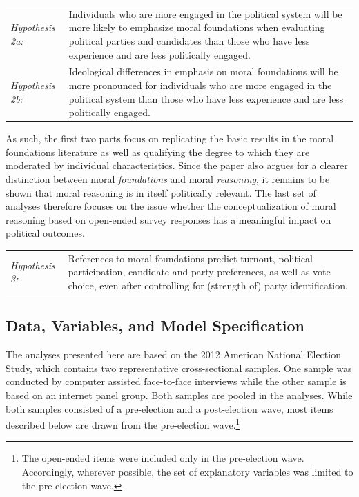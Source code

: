 \documentclass[12pt]{article}
\begin{document}
\vspace{0.3cm}
\begin{tabular}{lp{12cm}}
\textsl{Hypothesis 2a:} & Individuals who are more engaged in the political system will be more likely to emphasize moral foundations when evaluating political parties and candidates than those who have less experience and are less politically engaged. \\
\textsl{Hypothesis 2b:} & Ideological differences in emphasis on moral foundations will be more pronounced for individuals who are more engaged in the political system than those who have less experience and are less politically engaged.
\end{tabular}
\vspace{0.5cm}

As such, the first two parts focus on replicating the basic results in the moral foundations literature as well as qualifying the degree to which they are moderated by individual characteristics. Since the paper also argues for a clearer distinction between moral \textit{foundations} and moral \textit{reasoning}, it remains to be shown that moral reasoning is in itself politically relevant. The last set of analyses therefore focuses on the issue whether the conceptualization of moral reasoning based on open-ended survey responses has a meaningful impact on political outcomes.

\vspace{0.3cm}
\begin{tabular}{lp{12cm}}
\textsl{Hypothesis 3:} & References to moral foundations predict turnout, political participation, candidate and party preferences, as well as vote choice, even after controlling for (strength of) party identification.
\end{tabular}
\vspace{0.5cm}


\subsection{Data, Variables, and Model Specification}

The analyses presented here are based on the 2012 American National Election Study, which contains two representative cross-sectional samples. One sample was conducted by computer assisted face-to-face interviews while the other sample is based on an internet panel group. Both samples are pooled in the analyses. While both samples consisted of a pre-election and a post-election wave, most items described below are drawn from the pre-election wave.\footnote{The open-ended items were included only in the pre-election wave. Accordingly, wherever possible, the set of explanatory variables was limited to the pre-election wave.}
\end{document}
